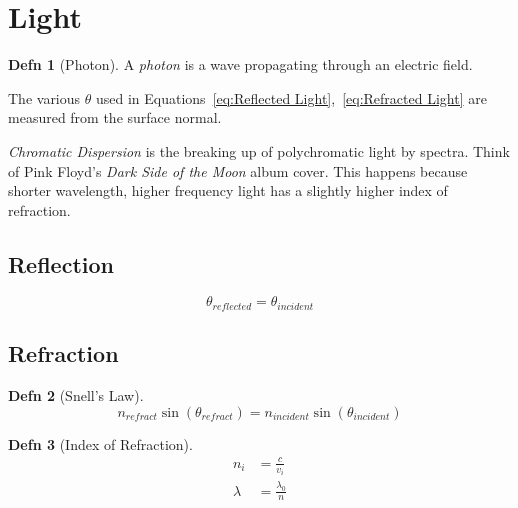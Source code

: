 \documentclass[10pt,letterpaper,final,twoside,notitlepage]{article}
\numberwithin{equation}{section} %
\theoremstyle{definition}
\newtheorem{definition}{Defn} %
\theoremstyle{remark}
\begin{document}
\section{Light} \label{sec:Light}
	\begin{definition}[Photon]
		A \emph{photon} is a wave propagating through an electric field.
	\end{definition}
The various $\theta$ used in Equations~\eqref{eq:Reflected Light},~\eqref{eq:Refracted Light} are measured from the surface normal.

\emph{Chromatic Dispersion} is the breaking up of polychromatic light by spectra.
Think of Pink Floyd's \textit{Dark Side of the Moon} album cover.
This happens because shorter wavelength, higher frequency light has a slightly higher index of refraction.

	\subsection*{Reflection} \label{subsec:Reflection}
		\begin{equation} \label{eq:Reflected Light}
			\theta_{reflected} = \theta_{incident}
		\end{equation}
		
	\subsection*{Refraction} \label{subsec:Refraction}
		\begin{definition}[Snell's Law] \label{def:Snell's Law}
			\begin{equation} \label{eq:Refracted Light} 
				n_{refract} \sin \left( \theta_{refract} \right) = n_{incident} \sin \left( \theta_{incident} \right)
			\end{equation}
		\end{definition}
		\begin{definition}[Index of Refraction] \label{def:Index of Refraction}
			\begin{equation} \label{eq:Index of Refraction}
				\begin{aligned}
					n_{i} &= \frac{c}{v_{i}} \\
					\lambda &= \frac{\lambda_{0}}{n} \\
				\end{aligned}
			\end{equation}
		\end{definition}
	
\end{document}
